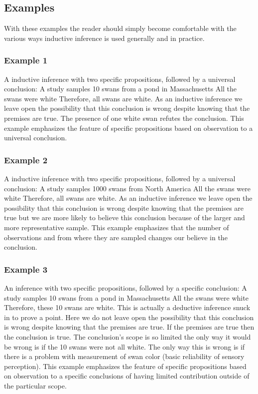 \documentclass[
]{book}
\begin{document}
\hypertarget{examples}{%
\subsection{Examples}\label{examples}}

With these examples the reader should simply become comfortable with the various ways inductive inference is used generally and in practice.

\hypertarget{example-1}{%
\subsubsection{Example 1}\label{example-1}}

A inductive inference with two specific propositions, followed by a universal conclusion:
A study samples 10 swans from a pond in Massachusetts
All the swans were white
Therefore, all swans are white.
As an inductive inference we leave open the possibility that this conclusion is wrong despite knowing that the premises are true. The presence of one white swan refutes the conclusion.
This example emphasizes the feature of specific propositions based on observation to a universal conclusion.

\hypertarget{example-2}{%
\subsubsection{Example 2}\label{example-2}}

A inductive inference with two specific propositions, followed by a universal conclusion:
A study samples 1000 swans from North America
All the swans were white
Therefore, all swans are white.
As an inductive inference we leave open the possibility that this conclusion is wrong despite knowing that the premises are true but we are more likely to believe this conclusion because of the larger and more representative sample. This example emphasizes that the number of observations and from where they are sampled changes our believe in the conclusion.

\hypertarget{example-3}{%
\subsubsection{Example 3}\label{example-3}}

An inference with two specific propositions, followed by a specific conclusion:
A study samples 10 swans from a pond in Massachusetts
All the swans were white
Therefore, these 10 swans are white.
This is actually a deductive inference snuck in to prove a point. Here we do not leave open the possibility that this conclusion is wrong despite knowing that the premises are true. If the premises are true then the conclusion is true. The conclusion's scope is so limited the only way it would be wrong is if the 10 swans were not all white. The only way this is wrong is if there is a problem with measurement of swan color (basic reliability of sensory perception).
This example emphasizes the feature of specific propositions based on observation to a specific conclusions of having limited contribution outside of the particular scope.
\end{document}
